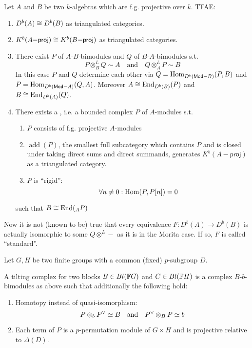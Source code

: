 \documentclass[fontsize=11pt,fleqn,a4paper]{scrartcl}
\begin{document}
\begin{theorem}
Let $A$ and $B$ be two $k$-algebras which are f.g. projective over $k$. TFAE:
\begin{enumerate}
\item $D^b(A) \cong D^b(B)$ as triangulated categories.
\item $K^b(A\mathsf{-proj}) \cong K^b(B\mathsf{-proj})$ as triangulated categories.
\item There exist $P$ of $A$-$B$-bimodules and $Q$ of $B$-$A$-bimodules s.t.
\[P \otimes_B^L Q \sim A \quad\text{and}\quad Q \otimes_A^L P \sim B\]
In this case $P$ and $Q$ determine each other via $Q=\operatorname{Hom}_{D^b(\mathsf{Mod-}B)}(P,B)$ and $P=\operatorname{Hom}_{D^b(\mathsf{Mod-}A)}(Q,A)$. Moreover $A\cong\operatorname{End}_{D^b(B)}(P)$ and $B\cong\operatorname{End}_{D^b(A)}(Q)$.
\item There exists a , i.e. a bounded complex $P$ of $A$-modules s.t.
\begin{enumerate}
\item $P$ consists of f.g. projective $A$-modules
\item $\operatorname{add}(P)$, the smallest full subcategory which contains $P$ and is closed under taking direct sums and direct summands, generates $K^b(A-\mathsf{proj})$ as a triangulated category.
\item $P$ is \enquote{rigid}:
\[\forall n\neq 0: \operatorname{Hom}(P,P[n]) = 0\]
\end{enumerate}
such that $B\cong\operatorname{End}({}_A P)$
\end{enumerate}
\end{theorem}

\begin{remark}
Now it is not (known to be) true that every equivalence $F: D^b(A)\to D^b(B)$ is actually isomorphic to some $Q\otimes^L-$ as it is in the Morita case. If so, $F$ is called \enquote{standard}.
\end{remark}

\begin{definition}[Rickard]
Let $G,H$ be two finite groups with a common (fixed) $p$-subgroup $D$.

A  tilting complex for two blocks $B\in Bl(\mathbb{F} G)$ and $C\in Bl(\mathbb{F} H)$ is a complex $B$-$b$-bimodules as above such that additionally the following hold:
\begin{enumerate}
\item Homotopy instead of quasi-isomorphism:
\[P \otimes_b P^\vee \simeq B \quad\text{and}\quad P^\vee \otimes_B P \simeq b\]
\item Each term of $P$ is a $p$-permutation module of $G\times H$ and is projective relative to $\Delta(D)$.
\end{enumerate}
\end{definition}
\end{document}

